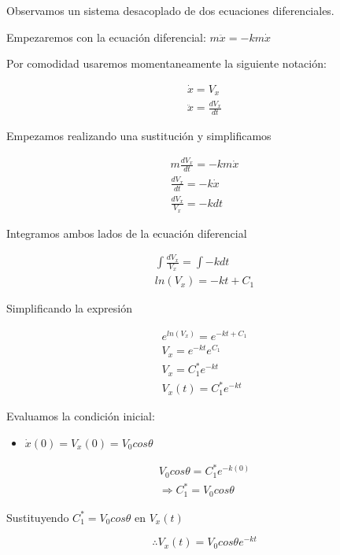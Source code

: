 Observamos un sistema desacoplado de dos ecuaciones diferenciales.

\vspace*{5 mm}

Empezaremos con la ecuación diferencial: $ m\ddot{x} = -km\dot{x} $

\vspace*{5 mm}

Por comodidad usaremos momentaneamente la siguiente notación: 

\begin{gather*}
    \dot{x} = V_{x} \\
    \ddot{x} = \frac{dV_{x}}{dt}
\end{gather*}

Empezamos realizando una sustitución y simplificamos

\begin{gather*}
    m\frac{d V_{x}}{dt} = -km\dot{x} \\
    \frac{d V_{x}}{dt} = -k\dot{x} \\
    \frac{ d V_{x}}{V_{x}} = -kdt 
\end{gather*}

Integramos  ambos lados de la ecuación diferencial

\begin{gather*}
    \int \frac{ d V_{x}}{V_{x}} = \int -kdt \\
    ln(V_{x}) = -kt+C_{1}
\end{gather*}

Simplificando la expresión

\begin{gather*}
    e^{ln(V_{x})} = e^{-kt+C_{1}} \\
    V_{x} = e^{-kt} e^{C_{1}} \\
    V_{x} = C_{1}^{*}e^{-kt}  \\
    V_{x} (t) = C_{1}^{*}e^{-kt}
\end{gather*}

Evaluamos la condición inicial:

\begin{itemize}
    \item $\dot{x} (0) = V_{x} (0) = V_{0}cos \theta$
\end{itemize}

\begin{gather*}
    V_{0}cos \theta =  C_{1}^{*}e^{-k(0)} \\
    \Longrightarrow C_{1}^{*} = V_{0}cos \theta
\end{gather*}

Sustituyendo $C_{1}^{*} = V_{0}cos \theta$ en $V_{x} (t)$

\begin{equation*}
    \therefore  V_{x} (t) = V_{0}cos \theta e^{-kt}
\end{equation*}
